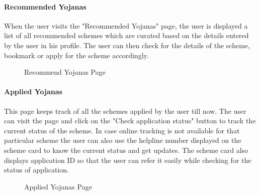\documentclass[conference]{IEEEtran}
\begin{document}
\paragraph{Recommended Yojanas}
When the user visits the "Recommended Yojanas" page, the user is displayed a list of all recommended schemes which are curated based on the details entered by the user in his profile. The user can then check for the details of the scheme, bookmark or apply for the scheme accordingly.

\begin{figure}[h!]
\centering
{}
\caption{Recommend Yojanas Page}
\end{figure}
\paragraph{Applied Yojanas}
This page keeps track of all the schemes applied by the user till now. The user can visit the page and click on the "Check application status" button to track the current status of the scheme. In case online tracking is not available for that particular scheme the user can also use the helpline number displayed on the scheme card to know the current status and get updates. The scheme card also displays application ID so that the user can refer it easily while checking for the status of application.

\begin{figure}[h!]
\centering
{}
\caption{Applied Yojanas Page}
\end{figure}
\end{document}
